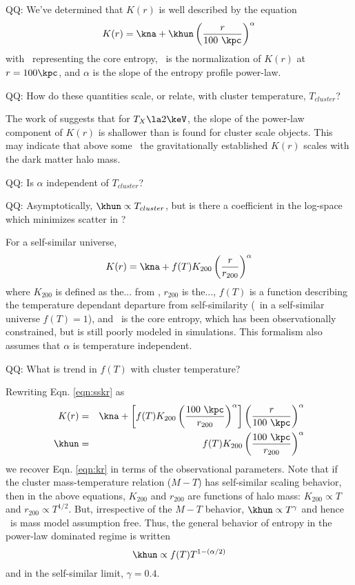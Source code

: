 \documentclass[iop]{emulateapj-rtx4}
\begin{document}
QQ: We've determined that $K(r)$ is well described by the equation
\begin{equation}
  K(r) = \kna + \khun \left(\frac{r}{100 ~\kpc}\right)^{\alpha}
\label{eqn:kr}
\end{equation}
with \kna\ representing the core entropy, \khun\ is the normalization
of $K(r)$ at $r=100\kpc$, and $\alpha$ is the slope of the entropy
profile power-law. 

QQ: How do these quantities scale, or relate, with cluster
temperature, $T_{cluster}$?

The work of \citet{minggroups} suggests that for $T_{X} \la 2\keV$,
the slope of the power-law component of $K(r)$ is shallower than is
found for cluster scale objects. This may indicate that above some
\tx\ the gravitationally established $K(r)$ scales with the dark
matter halo mass.

QQ: Is $\alpha$ independent of $T_{cluster}$?

QQ: Asymptotically, $\khun \propto T_{cluster}$, but is there a
coefficient in the log-space which minimizes scatter in \khun?

For a self-similar universe,
\begin{equation}
K(r) = \kna + f(T) K_{200} \left(\frac{r}{r_{200}}\right)^{\alpha}
\label{eqn:sskr}
\end{equation}
where $K_{200}$ is defined as the... from \citet{...}, $r_{200}$ is
the..., $f(T)$ is a function describing the temperature dependant
departure from self-similarity (\eg\ in a self-similar universe
$f(T)=1$), and \kna\ is the core entropy, which has been
observationally constrained, but is still poorly modeled in
simulations. This formalism also assumes that $\alpha$ is temperature
independent.

QQ: What is trend in $f(T)$ with cluster temperature?

Rewriting Eqn. \ref{eqn:sskr} as
\begin{eqnarray}
  K(r) &=& \kna + \left[f(T) K_{200}
    \left(\frac{100 ~\kpc}{r_{200}}\right)^{\alpha}\right]
    \left(\frac{r}{100 ~\kpc}\right)^{\alpha}\\
  \khun &=& f(T) K_{200} \left(\frac{100
    ~\kpc}{r_{200}}\right)^{\alpha}
  \label{eqn:obskr}
\end{eqnarray}
we recover Eqn. \ref{eqn:kr} in terms of the observational
parameters. Note that if the cluster mass-temperature relation ($M-T$)
has self-similar scaling behavior, then in the above equations,
$K_{200}$ and $r_{200}$ are functions of halo mass: $K_{200} \propto
T$ and $r_{200} \propto T^{1/2}$. But, irrespective of the $M-T$
behavior, $\khun \propto T^{\gamma}$ and hence \khun\ is mass model
assumption free. Thus, the general behavior of entropy in the
power-law dominated regime is written
\begin{equation}
\khun \propto f(T) T^{1-(\alpha/2)}
\label{eqn:genkr}
\end{equation}
and in the self-similar limit, $\gamma = 0.4$.
\end{document}
